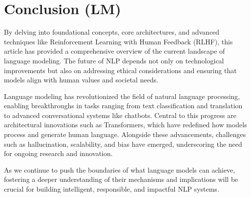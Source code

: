 \section{Conclusion (LM)}
    \large By delving into foundational concepts, core architectures, and advanced techniques like Reinforcement Learning with Human Feedback (RLHF), this article has provided a comprehensive overview of the current landscape of language modeling. The future of NLP depends not only on technological improvements but also on addressing ethical considerations and ensuring that models align with human values and societal needs. 

    Language modeling has revolutionized the field of natural language processing, enabling breakthroughs in tasks ranging from text classification and translation to advanced conversational systems like chatbots. Central to this progress are architectural innovations such as Transformers, which have redefined how models process and generate human language. Alongside these advancements, challenges such as hallucination, scalability, and bias have emerged, underscoring the need for ongoing research and innovation. 

    As we continue to push the boundaries of what language models can achieve, fostering a deeper understanding of their mechanisms and implications will be crucial for building intelligent, responsible, and impactful NLP systems.
